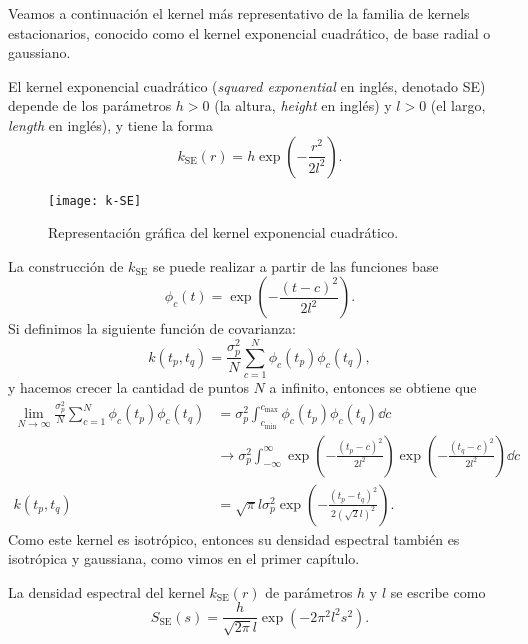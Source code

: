 Veamos a continuación el kernel más representativo de la familia de kernels estacionarios, conocido como el kernel exponencial cuadrático, de base radial o gaussiano.

\begin{definition}
	El kernel exponencial cuadrático (\emph{squared exponential} en inglés, denotado SE) depende de los parámetros \(h > 0\) (la altura, \emph{height} en inglés) y \(l > 0\) (el largo, \emph{length} en inglés), y tiene la forma
	\[k_{\mathrm{SE}}(r) = h \exp \left(-\frac{r^{2}}{2 l^{2}}\right).\]
\end{definition}

\begin{figure}[h]
	\centering
	\texttt{[image: k-SE]}
	\caption{Representación gráfica del kernel exponencial cuadrático.}
\end{figure}

La construcción de \(k_{\mathrm{SE}}\) se puede realizar a partir de las funciones base
\begin{equation*}
	\phi_{c}(t) = \exp \left(-\frac{(t-c)^{2}}{2l^{2}}\right).
\end{equation*}
Si definimos la siguiente función de covarianza:
\[k(t_{p}, t_{q}) = \frac{\sigma_{p}^{2}}{N} \sum_{c=1}^{N} \phi_{c}(t_{p}) \phi_{c}(t_{q}),\]
y hacemos crecer la cantidad de puntos \(N\) a infinito, entonces se obtiene que
\begin{align*}
	\lim_{N \to \infty} \frac{\sigma_{p}^{2}}{N} \sum_{c=1}^{N} \phi_{c}(t_{p}) \phi_{c}(t_{q})	&= \sigma_{p}^{2} \int_{c_{\min}}^{c_{\max}} \phi_{c} (t_{p}) \phi_{c}(t_{q}) \dd{c} \\
																								&\to \sigma_{p}^{2} \int_{-\infty}^{\infty}\exp \left(-\frac{(t_{p} - c)^2}{2l^2}\right) \exp \left(-\frac{(t_{q} - c)^2}{2 l^2}\right) \dd{c} \\
	k(t_{p}, t_{q})																				&= \sqrt{\pi} l \sigma_{p}^{2} \exp \left(-\frac{(t_{p} - t_{q})^2}{2 (\sqrt{2} l)^2}\right).
\end{align*}
Como este kernel es isotrópico, entonces su densidad espectral también es isotrópica y gaussiana, como vimos en el primer capítulo.

\begin{proposition}
	La densidad espectral del kernel \(k_{\mathrm{SE}}(r)\) de parámetros \(h\) y \(l\) se escribe como
	\begin{equation*}
		S_{\mathrm{SE}}(s) = \frac{h}{\sqrt{2\pi} l} \exp \left(-2\pi^{2} l^{2} s^{2}\right).
	\end{equation*}
\end{proposition}

